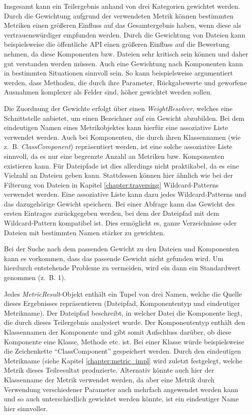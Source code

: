 Insgesamt kann ein Teilergebnis anhand von drei Kategorien gewichtet werden. Durch die Gewichtung aufgrund der verwendeten Metrik können bestimmten Metriken einen größeren Einfluss auf das Gesamtergebnis haben, wenn diese als vertrauenswürdiger empfunden werden. Durch die Gewichtung von Dateien kann beispielsweise die öffentliche \ac{API} einen größeren Einfluss auf die Bewertung nehmen, da diese Komponenten bzw. Dateien sehr kritisch sein können und daher gut verstanden werden müssen. Auch eine Gewichtung nach Komponenten kann in bestimmten Situationen sinnvoll sein. So kann beispielsweise argumentiert werden, dass Methoden, die durch ihre Parameter, Rückgabewerte und geworfene Ausnahmen komplexer als Felder sind, höher gewichtet werden sollen.

Die Zuordnung der Gewichte erfolgt über einen \textit{WeightResolver}, welches eine Schnittstelle anbietet, um einen Bezeichner auf ein Gewicht abzubilden. Bei dem eindeutigen Namen eines Metrikobjektes kann hierfür eine assoziative Liste verwendet werden. Auch bei Komponenten, die durch ihren Klassennamen (wie z.~B. \textit{ClassComponent}) repräsentiert werden, ist  eine solche assoziative Liste sinnvoll, da es nur eine begrenzte Anzahl an Metriken bzw. Komponenten existieren kann.
Für Dateipfade ist dies allerdings nicht praktikabel, da es eine Vielzahl an Dateien geben kann. Stattdessen können hier ähnlich wie bei der Filterung von Dateien in Kapitel \ref{chapter:traversing} Wildcard-Patterns verwendet werden. Eine assoziative Liste kann dazu jedes Wildcard-Patterns und das dazugehörige Gewicht speichern. Bei einer Abfrage kann das Gewicht des ersten Eintrages zurückgegeben werden, bei dem der Dateipfad mit dem Wildcard-Pattern kompatibel ist. Dies ermöglicht es, ganze Verzeichnisse oder Dateien mit bestimmten Namen stärker zu gewichten. 

Bei der Suche nach dem passenden Gewicht zu den Dateien und Komponenten kann es vorkommen, dass das passende Gewicht nicht gefunden wird. Um hierdurch entstehende Probleme zu vermeiden, wird ein dann ein Standardwert genommen (z.~B. 1). 

Jedes \textit{MetricResult}-Objekt enthält ein Tupel von drei Namen, welche die Quelle dieses Ergebnisses repräsentieren (Dateipfad, Komponententyp und eindeutiger Metrikname). Der Dateipfad beschreibt, in welcher Datei die Komponente liegt, die durch dieses Teilergebnis analysiert wurde. Der Komponententyp enthält den Klassennamen der Komponente und gibt somit Aufschluss darüber, ob diese Komponente eine Klasse, Methode etc. ist. Bei einer Klasse würde beispielsweise die Zeichenkette \enquote{ClassComponent} gespeichert werden. Durch den eindeutigen Metrikname (siehe Kapitel \ref{chapter:metric_impl} wird zuletzt festgelegt, welche Metrik dieses Teilresultat produzierte. Alternativ könnte auch hier der Klassenname der Metrik verwendet werden, da aber eine Metrik durch Verwendung verschiedener Parameter auch mehrfach angewendet werden kann und so auch unterschiedlich gewichtet werden könnte, ist ein eindeutiger Name hier sinnvoller.

